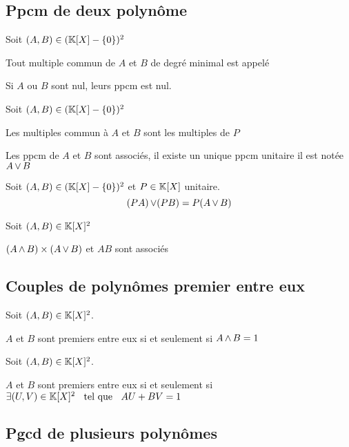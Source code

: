 \subsection{Ppcm de deux polynôme}

\begin{dfn}
  Soit $(A, B) \in (\mathbb{K}[X] - \{0\})^2$

  Tout multiple commun de $A$ et $B$ de degré minimal
  est appelé 

  Si $A$ ou $B$ sont nul, leurs ppcm est nul.
\end{dfn}

\begin{prp}
  Soit $(A, B) \in (\mathbb{K}[X] - \{0\})^2$

  Les multiples commun à $A$ et $B$ sont les multiples de $P$

  Les ppcm de $A$ et $B$ sont associés, il existe un unique
  ppcm unitaire il est notée $A \operatorname{\vee} B$
\end{prp}

\begin{prp}
  Soit $(A, B) \in (\mathbb{K}[X] - \{0\})^2$ et $P \in \mathbb{K}[X]$
  unitaire.
  \[
    (P A) \operatorname{\vee} (P B) = P (A \operatorname{\vee} B)
  \]
\end{prp}

\begin{prp}
  Soit $(A, B) \in \mathbb{K}[X]^2$
  
  $(A \operatorname{\wedge} B) \times (A \operatorname{\vee} B)$ et $A B$ sont associés
\end{prp}

\subsection{Couples de polynômes premier entre eux}

\begin{dfn}
  Soit $(A, B) \in \mathbb{K}[X]^2$.

  $A$ et $B$ sont premiers entre eux si et seulement si $A \operatorname{\wedge} B = 1$
\end{dfn}

\begin{thm}[Bézout]
  Soit $(A, B) \in \mathbb{K}[X]^2$.

  $A$ et $B$ sont premiers entre eux si et seulement si
  $\exists (U, V) \in \mathbb{K}[X]^2 \;\;\text{ tel que }\;\; A U + B V = 1$
\end{thm}

\subsection{Pgcd de plusieurs polynômes}

